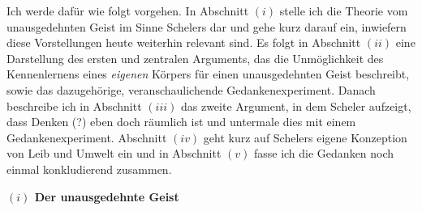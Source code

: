 \documentclass[a4paper, 12pt]{article}
\begin{document}
\begin{onehalfspace}
Ich werde dafür wie folgt vorgehen. In Abschnitt $(i)$ stelle ich die Theorie vom unausgedehnten Geist im Sinne Schelers dar und gehe kurz darauf ein, inwiefern diese Vorstellungen heute weiterhin relevant sind. Es folgt in Abschnitt $(ii)$ eine Darstellung des ersten und zentralen Arguments, das die Unmöglichkeit des Kennenlernens eines \emph{eigenen} Körpers für einen unausgedehnten Geist beschreibt, sowie das dazugehörige, veranschaulichende Gedankenexperiment. Danach beschreibe ich in Abschnitt $(iii)$ das zweite Argument, in dem Scheler aufzeigt, dass Denken (?) eben doch räumlich ist und untermale dies mit einem Gedankenexperiment. Abschnitt $(iv)$ geht kurz auf Schelers eigene Konzeption von Leib und Umwelt ein und in Abschnitt $(v)$ fasse ich die Gedanken noch einmal konkludierend zusammen. %

\vspace{5mm}
\noindent\textbf{$(i)$ Der unausgedehnte Geist}




\end{onehalfspace}
\end{document}
